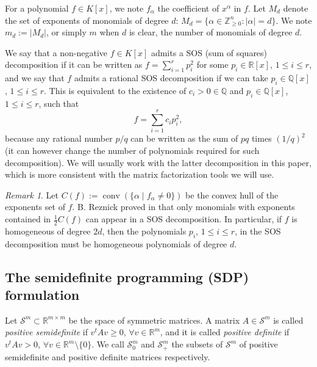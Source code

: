\documentclass{amsart}
\theoremstyle{definition}
\theoremstyle{remark}
\newtheorem{remark}[theorem]{Remark}
\numberwithin{equation}{section}
\DeclareMathOperator{\conv}{conv}
\newcommand{\Sym}{{\mathcal S}}
\newcommand{\Q}{{\mathbb Q}}
\newcommand{\R}{{\mathbb R}}
\newcommand{\Z}{{\mathbb Z}}
\begin{document}
For a polynomial $f \in K[x]$, we note $f_\alpha$ the coefficient of $x^\alpha$ in $f$. Let $M_d$ denote the set of exponents of monomials of degree $d$: $M_d = \{\alpha \in \Z^n_{\ge 0}: |\alpha| = d\}$. We note $m_d := |M_d|$, or simply $m$ when $d$ is clear, the number of monomials of degree $d$.

We say that a non-negative $f \in K[x]$ admits a SOS (sum of squares) decomposition if it can be written as $f = \sum_{i=1}^r p_i^2$ for some $p_i \in \R[x]$, $1 \le i \le r$, and we say that $f$ admits a rational SOS decomposition if we can take $p_i \in \Q[x]$, $1 \le i \le r$. This is equivalent to the existence of  $c_i > 0 \in \Q$ and $p_i \in \Q[x]$, $1 \le i \le r$, such that
\[
f = \sum_{i=1}^r c_i p_i^2,
\]
because any rational number $p / q$ can be written as the sum of $pq$ times $(1/q)^2$ (it can however change the number of polynomials required for such decomposition). We will usually work with the latter decomposition in this paper, which is more consistent with the matrix factorization tools we will use.

\begin{remark}
Let $C(f) := \conv(\{\alpha \mid f_\alpha \neq 0\})$ be the convex hull of the exponents set of $f$. B. Reznick proved in \cite{Reznick} that only monomials with exponents contained in $\frac{1}{2} C(f)$ can appear in a SOS decomposition. In particular, if $f$ is homogeneous of degree $2d$, then the polynomials $p_i$, $1 \le i \le r$, in the SOS decomposition must be homogeneous polynomials of degree $d$.
\end{remark}


\subsection{The semidefinite programming (SDP) formulation}
\label{sub:sdp}
Let $\Sym^m \subset \R^{m \times m}$ be the space of symmetric matrices. A matrix $A \in \Sym^m$ is called \emph{positive semidefinite}  if $v^t A v \ge 0$, $\forall v \in \R^m$, and it is called \emph{positive definite} if $v^t A v > 0$, $\forall v \in \R^m \setminus \{0\}$.  We call $\Sym^m_0$ and $\Sym^m_+$ the subsets of $\Sym^m$ of positive semidefinite and positive definite matrices respectively.
\end{document}
